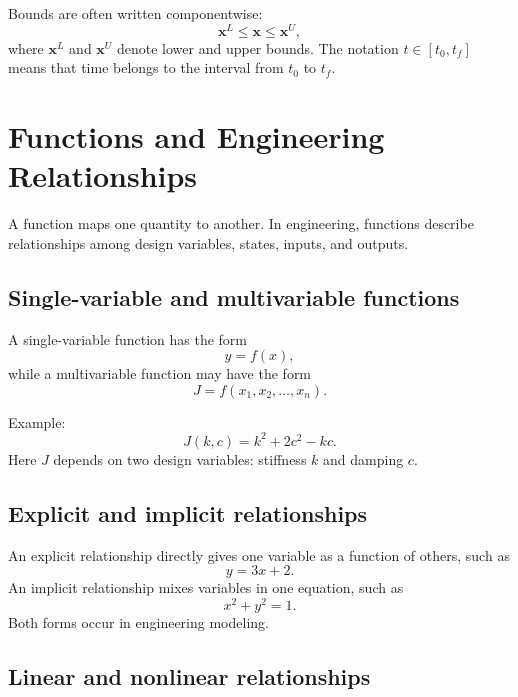 \documentclass[11pt]{article}
\newcommand{\vect}[1]{\boldsymbol{#1}}
\begin{document}
Bounds are often written componentwise:
\begin{equation}
\vect{x}^{L} \le \vect{x} \le \vect{x}^{U},
\end{equation}
where $\vect{x}^{L}$ and $\vect{x}^{U}$ denote lower and upper bounds. The notation $t\in[t_0,t_f]$ means that time belongs to the interval from $t_0$ to $t_f$.

\section{Functions and Engineering Relationships}

A function maps one quantity to another. In engineering, functions describe relationships among design variables, states, inputs, and outputs.

\subsection{Single-variable and multivariable functions}

A single-variable function has the form
\begin{equation}
 y=f(x),
\end{equation}
while a multivariable function may have the form
\begin{equation}
J = f(x_1,x_2,\ldots,x_n).
\end{equation}

Example:
\begin{equation}
J(k,c)=k^2+2c^2-kc.
\end{equation}
Here $J$ depends on two design variables: stiffness $k$ and damping $c$.

\subsection{Explicit and implicit relationships}

An explicit relationship directly gives one variable as a function of others, such as
\begin{equation}
 y = 3x+2.
\end{equation}
An implicit relationship mixes variables in one equation, such as
\begin{equation}
 x^2+y^2=1.
\end{equation}
Both forms occur in engineering modeling.

\subsection{Linear and nonlinear relationships}
\end{document}

